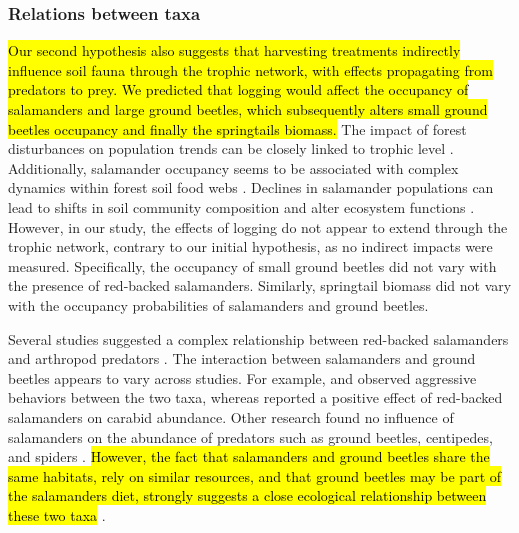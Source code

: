 \subsubsection*{Relations between taxa}
\label{disc:relations_between_taxa}

\hl{Our second hypothesis also suggests that harvesting treatments indirectly influence soil fauna through the trophic network, with effects propagating from predators to prey. 
We predicted that logging would affect the occupancy of salamanders and large ground beetles, which subsequently alters small ground beetles occupancy and finally the springtails biomass.} 
The impact of forest disturbances on population trends can be closely linked to trophic level \citep{Gotelli2006FoodWebModels,Nolte2019Habitatspecialization}. 
Additionally, salamander occupancy seems to be associated with complex dynamics within forest soil food webs \citep{baileyEstimatingSiteOccupancy2004,Walton2006Salamandersforestfloor,Rooney2000impactsalamander}. 
Declines in salamander populations can lead to shifts in soil community composition and alter ecosystem functions \citep{Hairston1987evolutioncompeting,Wyman1998Experimentalassessment,Rooney2000impactsalamander,Walton2005Contrastingeffects}. 
However, in our study, the effects of logging do not appear to extend through the trophic network, contrary to our initial hypothesis, as no indirect impacts were measured.
Specifically, the occupancy of small ground beetles did not vary with the presence of red-backed salamanders. 
Similarly, springtail biomass did not vary with the occupancy probabilities of salamanders and ground beetles. 

Several studies suggested a complex relationship between red-backed salamanders and arthropod predators \citep{Gall2003BehavioralInteractions,Walton2006Salamandersforestfloor,Hickerson2018Behavioralinteractions}. 
The interaction between salamanders and ground beetles appears to vary across studies.  
For example, \cite{Gall2003BehavioralInteractions} and \cite{Ovaska1988Predatorybehavior} observed aggressive behaviors between the two taxa, whereas \cite{Hickerson2012Interactionsforestfloor} reported a positive effect of red-backed salamanders on carabid abundance. 
Other research found no influence of salamanders on the abundance of predators such as ground beetles, centipedes, and spiders \citep{Hocking2013Effectsexperimental}. 
\hl{However, the fact that salamanders and ground beetles share the same habitats, rely on similar resources, and that ground beetles may be part of the salamanders diet, strongly suggests a close ecological relationship between these two taxa} \citep{Jaeger1980MicrohabitatsTerrestrial,loveiEcologyBehaviorGround1996}.

